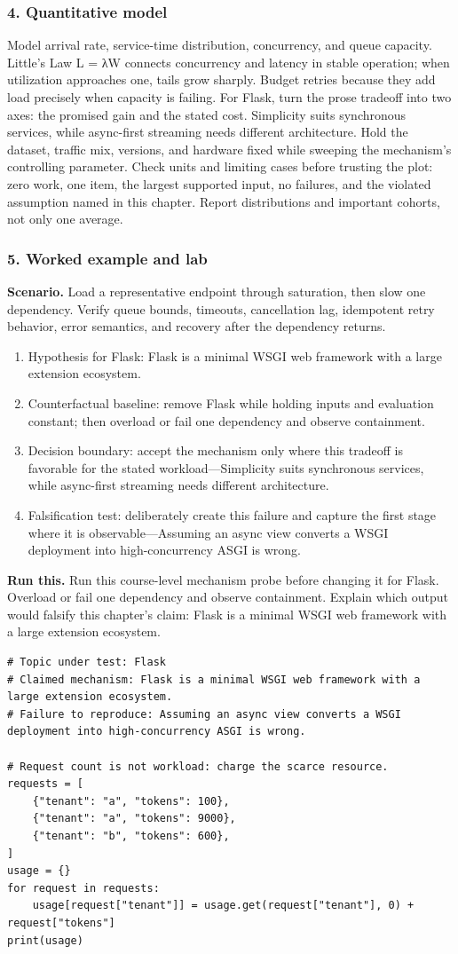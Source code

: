 \subsubsection*{4. Quantitative model}
Model arrival rate, service-time distribution, concurrency, and queue capacity. Little's Law L = λW connects concurrency and latency in stable operation; when utilization approaches one, tails grow sharply. Budget retries because they add load precisely when capacity is failing.
For Flask, turn the prose tradeoff into two axes: the promised gain and the stated cost. Simplicity suits synchronous services, while async-first streaming needs different architecture. Hold the dataset, traffic mix, versions, and hardware fixed while sweeping the mechanism's controlling parameter.
Check units and limiting cases before trusting the plot: zero work, one item, the largest supported input, no failures, and the violated assumption named in this chapter. Report distributions and important cohorts, not only one average.
\subsubsection*{5. Worked example and lab}
\textbf{Scenario.} Load a representative endpoint through saturation, then slow one dependency. Verify queue bounds, timeouts, cancellation lag, idempotent retry behavior, error semantics, and recovery after the dependency returns.
\begin{enumerate}
\item Hypothesis for Flask: Flask is a minimal WSGI web framework with a large extension ecosystem.
\item Counterfactual baseline: remove Flask while holding inputs and evaluation constant; then overload or fail one dependency and observe containment.
\item Decision boundary: accept the mechanism only where this tradeoff is favorable for the stated workload—Simplicity suits synchronous services, while async-first streaming needs different architecture.
\item Falsification test: deliberately create this failure and capture the first stage where it is observable—Assuming an async view converts a WSGI deployment into high-concurrency ASGI is wrong.
\end{enumerate}
\textbf{Run this.} Run this course-level mechanism probe before changing it for Flask. Overload or fail one dependency and observe containment. Explain which output would falsify this chapter's claim: Flask is a minimal WSGI web framework with a large extension ecosystem.
\begin{Verbatim}[fontsize=\scriptsize]
# Topic under test: Flask
# Claimed mechanism: Flask is a minimal WSGI web framework with a large extension ecosystem.
# Failure to reproduce: Assuming an async view converts a WSGI deployment into high-concurrency ASGI is wrong.

# Request count is not workload: charge the scarce resource.
requests = [
    {"tenant": "a", "tokens": 100},
    {"tenant": "a", "tokens": 9000},
    {"tenant": "b", "tokens": 600},
]
usage = {}
for request in requests:
    usage[request["tenant"]] = usage.get(request["tenant"], 0) + request["tokens"]
print(usage)
\end{Verbatim}
